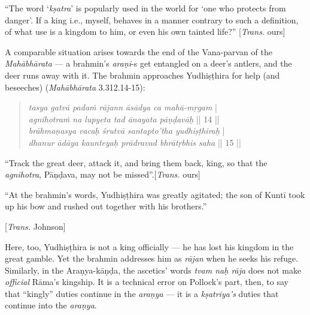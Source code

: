 \begin{myquote}
“The word ‘{\sl kṣatra}’ is popularly used in the world for ‘one who protects from danger’. If a king i.e., myself, behaves in a manner contrary to such a definition, of what use is a kingdom to him, or even his own tainted life?” 
\hfill[{\sl Trans.} ours]
\end{myquote}

A comparable situation arises towards the end of the Vana-parvan of the {\sl Mahābhārata} --- a brahmin’s {\sl araṇi}-s get entangled on a deer’s antlers, and the deer runs away with it. The brahmin approaches Yudhiṣṭhira for help (and beseeches) ({\sl Mahābhārata} 3.312.14-15): 

\newpage

\begin{quote}
{{\sl tasya gatvā padaṁ rājann āsādya ca mahā-mṛgam}} |\\
{\sl agnihotraṁ na lupyeta tad ānayata pāṇḍavāḥ} || 14 ||\\
{\sl brāhmaṇasya vacaḥ śrutvā santapto’tha yudhiṣṭhiraḥ} |\\
{\sl dhanur ādāya kaunteyaḥ prādravad bhrātṛbhis saha} || 15 ||
\end{quote}
\vskip -0.25cm

\begin{myquote}
“Track the great deer, attack it, and bring them back, king, so that the {\sl agnihotra}, Pāṇḍava, may not be missed”.\hfill [{\sl Trans.} ours]

“At the brahmin’s words, Yudhiṣṭhira was greatly agitated; the son of Kuntī took up his bow and rushed out together with his brothers.”

\hfill [{\sl Trans.} Johnson]
\end{myquote}

Here, too, Yudhiṣṭhira is not a king officially --- he has lost his kingdom in the great gamble. Yet the brahmin addresses him as {\sl rājan} when he seeks his refuge. Similarly, in the Araṇya-kāṇḍa, the ascetics’ words {\sl tvam naḥ rāja} does not make {\sl official} Rāma’s kingship. It is a technical error on Pollock’s part, then, to say that “kingly” duties continue in the {\sl araṇya} --- it is a {\sl kṣatriya’s} duties that continue into the {\sl araṇya}.

